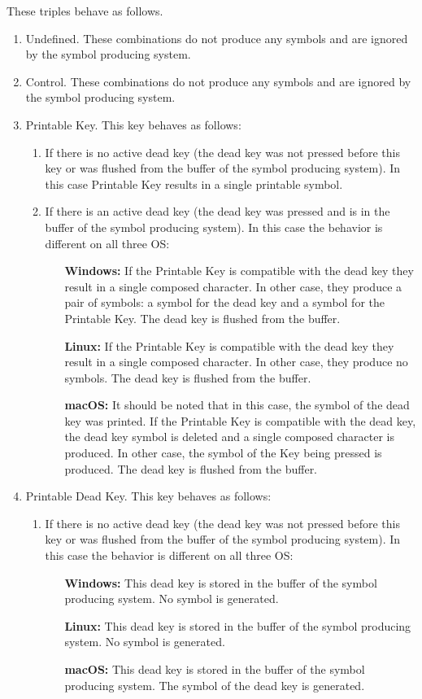 \documentclass{article}
\begin{document}
These triples behave as follows.
\begin{enumerate}
\item Undefined. These combinations do not produce any symbols and are ignored by the symbol producing system.

\item Control. These combinations do not produce any symbols and are ignored by the symbol producing system.

\item Printable Key. This key behaves as follows:
\begin{enumerate}
\item If there is no active dead key (the dead key was not pressed before this key or was flushed from the buffer of the symbol producing system). In this case Printable Key results in a single printable symbol.

\item If there is an active dead key (the dead key was pressed and is in the buffer of the symbol producing system). In this case the behavior is different on all three OS:
\begin{itemize}
\item[\bf Windows:] If the Printable Key is compatible with the dead key they result in a single composed character. In other case, they produce a pair of symbols: a symbol for the dead key and a symbol for the Printable Key. The dead key is flushed from the buffer.
\item[\bf Linux:] If the Printable Key is compatible with the dead key they result in a single composed character.  In other case, they produce no symbols. The dead key is flushed from the buffer.
\item[\bf macOS:] It should be noted that in this case, the symbol of the dead key was printed. If the Printable Key is compatible with the dead key, the dead key symbol is deleted and a single composed character is produced. In other case, the symbol of the Key being pressed is  produced. The dead key is flushed from the buffer.
\end{itemize}

\end{enumerate}
\item Printable Dead Key. This key behaves as follows:
\begin{enumerate}
\item If there is no active dead key (the dead key was not pressed before this key or was flushed from the buffer of the symbol producing system). In this case the behavior is different on all three OS:
\begin{itemize}
\item[\bf Windows:] This dead key is stored in the buffer of the symbol producing system. No symbol is generated.
\item[\bf Linux:] This dead key is stored in the buffer of the symbol producing system. No symbol is generated.
\item[\bf macOS:] This dead key is stored in the buffer of the symbol producing system. The symbol of the dead key is generated.
\end{itemize}


\end{enumerate}
\end{enumerate}
\end{document}
